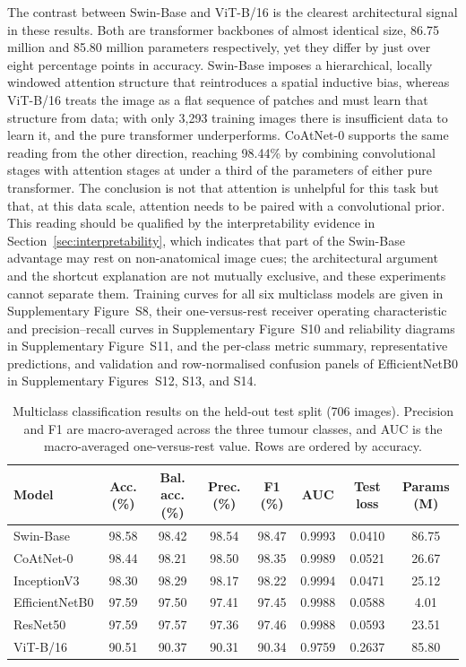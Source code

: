\documentclass[final,3p,times,number]{elsarticle}
\begin{document}
The contrast between Swin-Base and ViT-B/16 is the clearest architectural signal in these results. Both are transformer backbones of almost identical size, 86.75 million and 85.80 million parameters respectively, yet they differ by just over eight percentage points in accuracy. Swin-Base imposes a hierarchical, locally windowed attention structure that reintroduces a spatial inductive bias, whereas ViT-B/16 treats the image as a flat sequence of patches and must learn that structure from data; with only 3,293 training images there is insufficient data to learn it, and the pure transformer underperforms. CoAtNet-0 supports the same reading from the other direction, reaching 98.44\% by combining convolutional stages with attention stages at under a third of the parameters of either pure transformer. The conclusion is not that attention is unhelpful for this task but that, at this data scale, attention needs to be paired with a convolutional prior. This reading should be qualified by the interpretability evidence in Section~\ref{sec:interpretability}, which indicates that part of the Swin-Base advantage may rest on non-anatomical image cues; the architectural argument and the shortcut explanation are not mutually exclusive, and these experiments cannot separate them. Training curves for all six multiclass models are given in Supplementary Figure~S8, their one-versus-rest receiver operating characteristic and precision--recall curves in Supplementary Figure~S10 and reliability diagrams in Supplementary Figure~S11, and the per-class metric summary, representative predictions, and validation and row-normalised confusion panels of EfficientNetB0 in Supplementary Figures~S12, S13, and S14.

\begin{table}[htbp]
\centering
\caption{Multiclass classification results on the held-out test split (706 images). Precision and F1 are macro-averaged across the three tumour classes, and AUC is the macro-averaged one-versus-rest value. Rows are ordered by accuracy.}
\label{tab:multiclass-results}
\small
\begin{tabular*}{\textwidth}{@{\extracolsep{\fill}}lccccccc@{}}
\toprule
Model & Acc. (\%) & Bal. acc. (\%) & Prec. (\%) & F1 (\%) & AUC & Test loss & Params (M) \\
\midrule
Swin-Base & 98.58 & 98.42 & 98.54 & 98.47 & 0.9993 & 0.0410 & 86.75 \\
CoAtNet-0 & 98.44 & 98.21 & 98.50 & 98.35 & 0.9989 & 0.0521 & 26.67 \\
InceptionV3 & 98.30 & 98.29 & 98.17 & 98.22 & 0.9994 & 0.0471 & 25.12 \\
EfficientNetB0 & 97.59 & 97.50 & 97.41 & 97.45 & 0.9988 & 0.0588 & 4.01 \\
ResNet50 & 97.59 & 97.57 & 97.36 & 97.46 & 0.9988 & 0.0593 & 23.51 \\
ViT-B/16 & 90.51 & 90.37 & 90.31 & 90.34 & 0.9759 & 0.2637 & 85.80 \\
\bottomrule
\end{tabular*}
\end{table}
\end{document}
